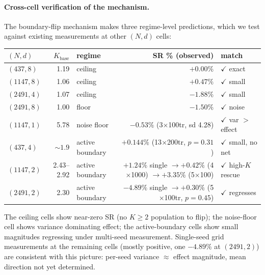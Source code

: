 \documentclass[11pt]{article}
\begin{document}
\paragraph{Cross-cell verification of the mechanism.}
The boundary-flip mechanism makes three regime-level predictions, which we test against existing measurements at other $(N, d)$ cells:

\begin{center}
\begin{tabular}{lrlrl}
\toprule
$(N, d)$ & $K_{\text{base}}$ & regime & SR \% (observed) & match \\
\midrule
$(437, 8)$ & 1.19 & ceiling & $+0.00\%$ & $\checkmark$ exact \\
$(1147, 8)$ & 1.06 & ceiling & $+0.47\%$ & $\checkmark$ small \\
$(2491, 4)$ & 1.07 & ceiling & $-1.88\%$ & $\checkmark$ small \\
$(2491, 8)$ & 1.00 & floor & $-1.50\%$ & $\checkmark$ noise \\
$(1147, 1)$ & 5.78 & noise floor & $-0.53\%$ (3$\times$100tr, sd 4.28) & $\checkmark$ var $>$ effect \\
$(437, 4)$ & $\sim 1.9$ & active boundary & $+0.144\%$ (13$\times$200tr, $p{=}0.31$) & $\checkmark$ small, no net \\
$(1147, 2)$ & 2.43--2.92 & active boundary & $+1.24\%$ single $\to +0.42\%$ (4$\times$1000) $\to +3.35\%$ (5$\times$100) & $\checkmark$ high-$K$ rescue \\
$(2491, 2)$ & 2.30 & active boundary & $-4.89\%$ single $\to +0.30\%$ (5$\times$100tr, $p{=}0.45$) & $\checkmark$ regresses \\
\bottomrule
\end{tabular}
\end{center}

The ceiling cells show near-zero SR (no $K \geq 2$ population to flip); the noise-floor cell shows variance dominating effect; the active-boundary cells show small magnitudes regressing under multi-seed measurement. Single-seed grid measurements at the remaining cells (mostly positive, one $-4.89\%$ at $(2491, 2)$) are consistent with this picture: per-seed variance $\approx$ effect magnitude, mean direction not yet determined.
\end{document}
